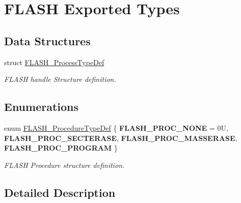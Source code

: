 \hypertarget{group___f_l_a_s_h___exported___types}{}\section{F\+L\+A\+SH Exported Types}
\label{group___f_l_a_s_h___exported___types}
\subsection*{Data Structures}
\begin{DoxyCompactItemize}
\item 
struct \hyperlink{struct_f_l_a_s_h___process_type_def}{F\+L\+A\+S\+H\+\_\+\+Process\+Type\+Def}
\begin{DoxyCompactList}\small\item\em F\+L\+A\+SH handle Structure definition. \end{DoxyCompactList}\end{DoxyCompactItemize}
\subsection*{Enumerations}
\begin{DoxyCompactItemize}
\item 
\mbox{\label{group___f_l_a_s_h___exported___types_ga2b0268387bc11bcab76be9ce7c43eaaf}} 
enum \hyperlink{group___f_l_a_s_h___exported___types_ga2b0268387bc11bcab76be9ce7c43eaaf}{F\+L\+A\+S\+H\+\_\+\+Procedure\+Type\+Def} \{ {\bfseries F\+L\+A\+S\+H\+\_\+\+P\+R\+O\+C\+\_\+\+N\+O\+NE} = 0U, 
{\bfseries F\+L\+A\+S\+H\+\_\+\+P\+R\+O\+C\+\_\+\+S\+E\+C\+T\+E\+R\+A\+SE}, 
{\bfseries F\+L\+A\+S\+H\+\_\+\+P\+R\+O\+C\+\_\+\+M\+A\+S\+S\+E\+R\+A\+SE}, 
{\bfseries F\+L\+A\+S\+H\+\_\+\+P\+R\+O\+C\+\_\+\+P\+R\+O\+G\+R\+AM}
 \}\begin{DoxyCompactList}\small\item\em F\+L\+A\+SH Procedure structure definition. \end{DoxyCompactList}
\end{DoxyCompactItemize}


\subsection{Detailed Description}
